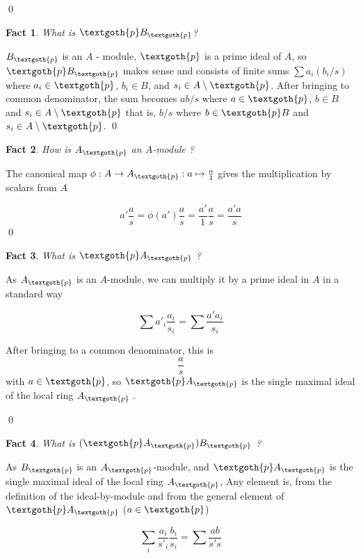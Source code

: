 \documentclass{article}
\newtheorem{theorem}{Fact}[section]
\begin{document}
\qed

\begin{theorem}
What is $ \textgoth{p} B_\textgoth{p}$?
\end{theorem}

$B_\textgoth{p}$ is an $A$ - module, $\textgoth{p}$ is a prime ideal of $A$, so $ \textgoth{p} B_\textgoth{p}$ makes sense and consists of finite sums $\sum a_i (b_i / s)$ where $a_i \in \textgoth{p}$, $b_i \in B$, and $s_i \in A \setminus \textgoth{p}$.
After bringing to common denominator, the sum becomes $ab/s$ where $a \in \textgoth{p}$, $b \in B$ and $s_i \in A \setminus \textgoth{p}$ that is, $b/s$ where $b \in \textgoth{p} B$ and $s_i \in A \setminus \textgoth{p}$.
\qed

\begin{theorem}
How is $A_\textgoth{p}$ an $A$-module ?
\end{theorem}

The canonical map $\phi: A \rightarrow A_\textgoth{p}: a \mapsto \frac{a}{1}$ gives the multiplication by scalars from $A$

\[
 a' \frac{a}{s} = \phi(a') \frac{a}{s} = \frac{a'}{1} \frac{a}{s} = \frac{a' a}{s}
\]
\qed


\begin{theorem}
What is $ \textgoth{p} A_\textgoth{p}$ ?
\end{theorem}

As $A_\textgoth{p}$ is an $A$-module, we can multiply it by a prime ideal in $A$ in a standard way

\[
 \sum a'_i \frac{a_i}{s_i} = \sum \frac{a' a_i}{s_i}
\]

\noindent
After bringing to a common denominator, this is
\[
 \frac{a}{s}
\]
\noindent
with $a \in \textgoth{p}$, so $ \textgoth{p} A_\textgoth{p}$ is the single maximal ideal of the local ring $A_\textgoth{p}$ .

\qed


\begin{theorem}
What is $(\textgoth{p} A_\textgoth{p}) B_\textgoth{p}$ ?
\end{theorem}

As $B_\textgoth{p}$ is an $A_\textgoth{p}$-module, and $\textgoth{p} A_\textgoth{p}$ is the single maximal ideal of the local ring $A_\textgoth{p}$, Any element is, from the definition of the ideal-by-module and from the general element of $\textgoth{p} A_\textgoth{p}$ ($a \in \textgoth{p}$)

\[
 \sum_i \frac{a_i}{s'_i} \frac{b_i}{s_i} = \sum \frac{ab}{s's}
\]
\end{document}
